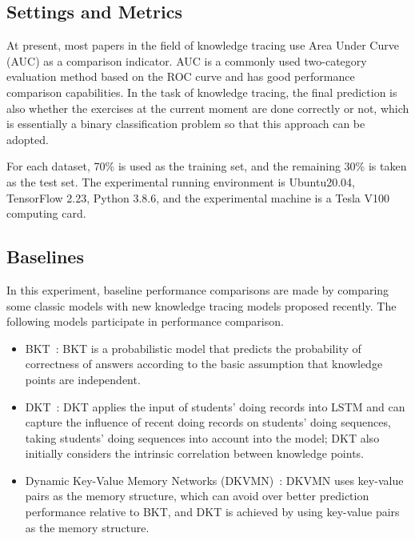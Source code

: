 \subsection{Settings and Metrics}
At present, most papers in the field of knowledge tracing use Area Under Curve (AUC) as a comparison indicator. AUC is a commonly used two-category evaluation method based on the ROC curve and has good performance comparison capabilities. In the task of knowledge tracing, the final prediction is also whether the exercises at the current moment are done correctly or not, which is essentially a binary classification problem so that this approach can be adopted.

For each dataset, 70\% is used as the training set, and the remaining 30\% is taken as the test set. The experimental running environment is Ubuntu20.04, TensorFlow 2.23, Python 3.8.6, and the experimental machine is a Tesla V100 computing card.

\subsection{Baselines}
In this experiment, baseline performance comparisons are made by comparing some classic models with new knowledge tracing models proposed recently. The following models participate in performance comparison.
\begin{itemize}
    \item BKT~\cite{yudelson2013individualized}: BKT is a probabilistic model that predicts the probability of correctness of answers according to the basic assumption that knowledge points are independent.
    \item DKT~\cite{piech2015deep}: DKT applies the input of students' doing records into LSTM and can capture the influence of recent doing records on students' doing sequences, taking students' doing sequences into account into the model; DKT also initially considers the intrinsic correlation between knowledge points.
    \item Dynamic Key-Value Memory Networks (DKVMN)~\cite{zhang2017dynamic}: DKVMN uses key-value pairs as the memory structure, which can avoid over better prediction performance relative to BKT, and DKT is achieved by using key-value pairs as the memory structure.
\end{itemize}

